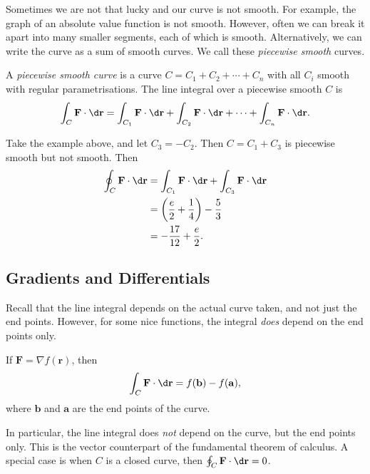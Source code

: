\documentclass[a4paper]{article}
\begin{document}
Sometimes we are not that lucky and our curve is not smooth. For example, the graph of an absolute value function is not smooth. However, often we can break it apart into many smaller segments, each of which is smooth. Alternatively, we can write the curve as a sum of smooth curves. We call these \emph{piecewise smooth} curves.

\begin{defi}
  A \emph{piecewise smooth curve} is a curve $C = C_1 + C_2 + \cdots + C_n$ with all $C_i$ smooth with regular parametrisations. The line integral over a piecewise smooth $C$ is
  \[
    \int_C \mathbf{F}\cdot \d \mathbf{r} = \int_{C_1} \mathbf{F}\cdot \d \mathbf{r} + \int_{C_2} \mathbf{F}\cdot \d \mathbf{r} + \cdots + \int_{C_n} \mathbf{F}\cdot \d \mathbf{r}.
  \]
\end{defi}

\begin{eg}
  Take the example above, and let $C_3 = -C_2$. Then $C = C_1 + C_3$ is piecewise smooth but not smooth. Then
  \begin{align*}
    \oint _C \mathbf{F}\cdot \d \mathbf{r} &= \int_{C_1} \mathbf{F}\cdot \d \mathbf{r} + \int_{C_3} \mathbf{F}\cdot \d \mathbf{r}\\
    &= \left(\frac{e}{2} + \frac{1}{4}\right) - \frac{5}{3}\\
    &= -\frac{17}{12} + \frac{e}{2}.
  \end{align*}
  \begin{center}
  \end{center}
\end{eg}
\subsection{Gradients and Differentials}
Recall that the line integral depends on the actual curve taken, and not just the end points. However, for some nice functions, the integral \emph{does} depend on the end points only.
\begin{thm}
  If $\mathbf{F} = \nabla f(\mathbf{r})$, then
  \[
    \int _C \mathbf{F}\cdot \d \mathbf{r} = f(\mathbf{b}) - f(\mathbf{a}),
  \]
  where $\mathbf{b}$ and $\mathbf{a}$ are the end points of the curve.

  In particular, the line integral does \emph{not} depend on the curve, but the end points only. This is the vector counterpart of the fundamental theorem of calculus. A special case is when $C$ is a closed curve, then $\oint_C \mathbf{F}\cdot \d \mathbf{r} = 0$.
\end{thm}
\end{document}
